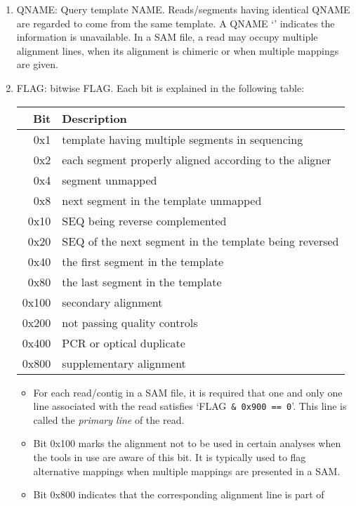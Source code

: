 \documentclass[10pt]{article}
\begin{document}
\begin{enumerate}
\item {\sf QNAME}: Query template NAME. Reads/segments having identical {\sf QNAME}
	are regarded to come from the same template. A {\sf QNAME} `{\tt *}'
	indicates the information is unavailable.  In a SAM file, a read may occupy
	multiple alignment lines, when its alignment is chimeric or when multiple
	mappings are given.
\item {\sf FLAG}: bitwise FLAG. Each bit is explained in the following
  table:
  \begin{center}\small
  \begin{tabular}{rl}
  \hline
  Bit & Description\\
  \hline
  0x1 &  template having multiple segments in sequencing \\
  0x2 &  each segment properly aligned according to the aligner \\
  0x4 &  segment unmapped \\
  0x8 &  next segment in the template unmapped \\
  0x10 &  {\sf SEQ} being reverse complemented \\
  0x20 &  {\sf SEQ} of the next segment in the template being reversed \\
  0x40 &  the first segment in the template \\
  0x80 &  the last segment in the template \\
  0x100 &  secondary alignment \\
  0x200 &  not passing quality controls \\
  0x400 &  PCR or optical duplicate \\
  0x800 &  supplementary alignment \\
  \hline
  \end{tabular}
  \end{center}
  \begin{itemize}
  \item For each read/contig in a SAM file, it is required that one and only
	one line associated with the read satisfies \mbox{`{\sf FLAG} {\tt \& 0x900
	== 0}'}. This line is called the \emph{primary line} of the read.
  \item Bit 0x100 marks the alignment not to be used in certain analyses
    when the tools in use are aware of this bit. It is typically used to
	flag alternative mappings when multiple mappings are presented in a SAM.
  \item Bit 0x800 indicates that the corresponding alignment line is part of

\end{itemize}
\end{enumerate}
\end{document}
